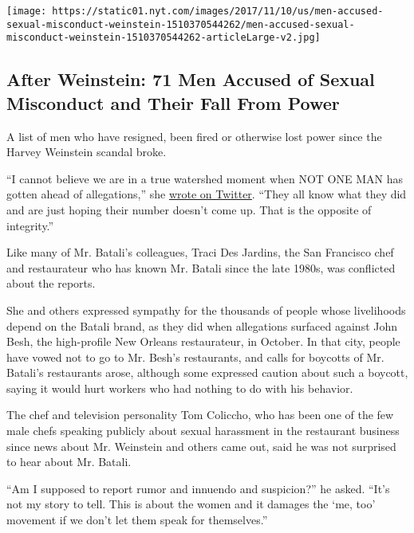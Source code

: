 \href{https://www.nytimes.com/interactive/2017/11/10/us/men-accused-sexual-misconduct-weinstein.html}{}

\texttt{[image: https://static01.nyt.com/images/2017/11/10/us/men-accused-sexual-misconduct-weinstein-1510370544262/men-accused-sexual-misconduct-weinstein-1510370544262-articleLarge-v2.jpg]}

\hypertarget{after-weinstein-71-men-accused-of-sexual-misconduct-and-their-fall-from-power}{%
\subsection{After Weinstein: 71 Men Accused of Sexual Misconduct and
Their Fall From
Power}\label{after-weinstein-71-men-accused-of-sexual-misconduct-and-their-fall-from-power}}

A list of men who have resigned, been fired or otherwise lost power
since the Harvey Weinstein scandal broke.

``I cannot believe we are in a true watershed moment when NOT ONE MAN
has gotten ahead of allegations,'' she
\href{https://twitter.com/tiffanifaison/status/940249384926744576}{wrote
on Twitter}. ``They all know what they did and are just hoping their
number doesn't come up. That is the opposite of integrity.''

Like many of Mr. Batali's colleagues, Traci Des Jardins, the San
Francisco chef and restaurateur who has known Mr. Batali since the late
1980s, was conflicted about the reports.

She and others expressed sympathy for the thousands of people whose
livelihoods depend on the Batali brand, as they did when allegations
surfaced against John Besh, the high-profile New Orleans restaurateur,
in October. In that city, people have vowed not to go to Mr. Besh's
restaurants, and calls for boycotts of Mr. Batali's restaurants arose,
although some expressed caution about such a boycott, saying it would
hurt workers who had nothing to do with his behavior.

The chef and television personality Tom Coliccho, who has been one of
the few male chefs speaking publicly about sexual harassment in the
restaurant business since news about Mr. Weinstein and others came out,
said he was not surprised to hear about Mr. Batali.

``Am I supposed to report rumor and innuendo and suspicion?'' he asked.
``It's not my story to tell. This is about the women and it damages the
`me, too' movement if we don't let them speak for themselves.''

